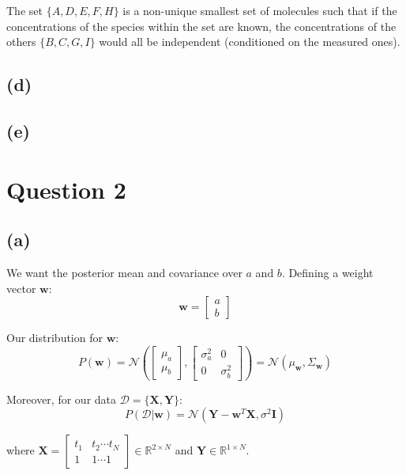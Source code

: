 \documentclass[12pt]{article}
\begin{document}
The set $\{A, D, E, F, H\}$ is a non-unique smallest set of molecules such that if the concentrations of the species within the set are known, the concentrations of the others $\{B, C, G, I\}$ would all be independent (conditioned on the measured ones).


\subsection*{(d)}

\newpage

\subsection*{(e)}

\newpage
\section*{Question 2}

\subsection*{(a)}

We want the posterior mean and covariance over $a$ and $b$.
Defining a weight vector $\textbf{w}$:
\[\textbf{w} = \begin{bmatrix}
                 a \\
                 b
         \end{bmatrix}\]

Our distribution for $\textbf{w}$:
\[P(\textbf{w}) = \mathcal{N} \left(
\begin{bmatrix}
                 \mu_a \\
                 \mu_b
         \end{bmatrix} ,
\begin{bmatrix}
                 \sigma_a^2 & 0 \\
                 0 & \sigma_b^2
         \end{bmatrix}
\right)
  = \mathcal{N}(\mu_{\textbf{w}}, \Sigma_{\textbf{w}})
\]

Moreover, for our data $\mathcal{D} = \{\textbf{X}, \textbf{Y}\}$:
\[P(\mathcal{D} | \textbf{w}) = \mathcal{N} \left( \textbf{Y} - \textbf{w}^T \textbf{X}, \sigma^2 \textbf{I}
\right)
\]

where $\textbf{X} =  \begin{bmatrix}
                 t_1 & t_2 \cdots t_N \\
                 1 & 1 \cdots 1
         \end{bmatrix} \in  \mathbb{R}^{2 \times N}$ and $\textbf{Y} \in \mathbb{R}^{1 \times N}$.
\end{document}
